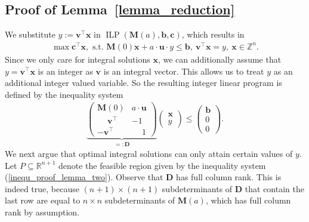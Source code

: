 \documentclass[a4paper, 11pt]{article}
\DeclareMathOperator{\ILP}{ILP}
\newcommand{\R}{\mathbb{R}}
\newcommand{\Z}{\mathbb{Z}}
\newcommand{\bD}{\bm{D}}
\newcommand{\bx}{\bm{x}}
\newcommand{\bc}{\bm{c}}
\newcommand{\bb}{\bm{b}}
\newcommand{\bv}{\bm{v}}
\newcommand{\bu}{\bm{u}}
\newcommand{\bM}{\bm{M}}
\newcommand{\intvar}{a}
\begin{document}
	\subsection{Proof of Lemma~\ref{lemma_reduction}}
	We substitute $y := \bv^\top\bx$ in $\ILP(\bM(\intvar),\bb,\bc)$, which results in  
	\begin{align*}
		\max \bc^\top\bx, \text{ s.t. } \bM(0)\bx + \intvar\cdot\bu \cdot y \leq \bb, \ \bv^\top\bx = y, \ \bx\in\Z^n.
	\end{align*}
	Since we only care for integral solutions $\bx$, we can additionally assume that $y = \bv^\top\bx$ is an integer as $\bv$ is an integral vector. This allows us to treat $y$ as an additional integer valued variable. So the resulting integer linear program is defined by the inequality system
	\begin{align}
		\label{inequ_proof_lemma_two}
		\underbrace{
			\begin{pmatrix}
				\bM(0) & \intvar\cdot\bu \\
				\phantom{-}\bv^\top & -1 \\
				-\bv^\top & \phantom{-}1
		\end{pmatrix}}_{=:\bD}
		\begin{pmatrix}
			\bx \\ y
		\end{pmatrix}
		\leq \begin{pmatrix}
			\bb \\ 0 \\ 0
		\end{pmatrix}.
	\end{align}
	We next argue that optimal integral solutions can only attain certain values of $y$. Let $P\subseteq \R^{n+1}$ denote the feasible region given by the inequality system (\ref{inequ_proof_lemma_two}). Observe that $\bD$ has full column rank. This is indeed true, because $(n+1)\times (n+1)$ subdeterminants of $\bD$ that contain the last row are equal to $n\times n$ subdeterminants of $\bM(\intvar)$, which has full column rank by assumption. 
	
\end{document}
